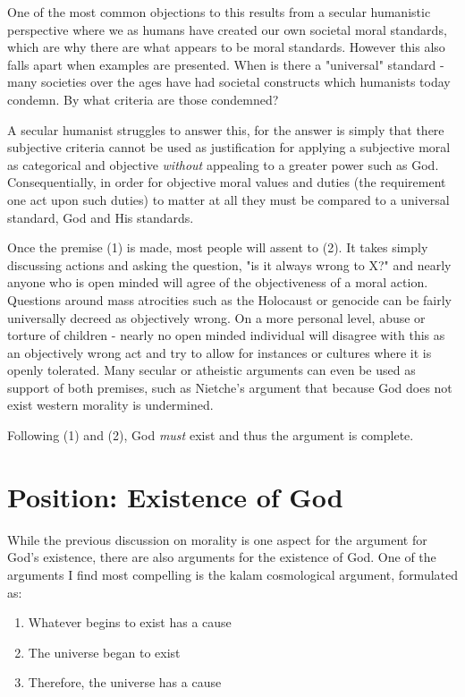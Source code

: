 \documentclass[12pt]{turabian-researchpaper}
\begin{document}
One of the most common objections to this results from a secular humanistic perspective where we as humans have created our own societal moral standards, which are why there are what appears to be moral standards. However this also falls apart when examples are presented. When is there a "universal" standard - many societies over the ages have had societal constructs which humanists today condemn. By what criteria are those condemned? 

A secular humanist struggles to answer this, for the answer is simply that there subjective criteria cannot be used as justification for applying a subjective moral as categorical and objective \textit{without} appealing to a greater power such as God. Consequentially, in order for objective moral values and duties (the requirement one act upon such duties) to matter at all they must be compared to a universal standard, God and His standards.

Once the premise (1) is made, most people will assent to (2). It takes simply discussing actions and asking the question, "is it always wrong to X?" and nearly anyone who is open minded will agree of the objectiveness of a moral action. Questions around mass atrocities such as the Holocaust or genocide can be fairly universally decreed as objectively wrong. On a more personal level, abuse or torture of children - nearly no open minded individual will disagree with this as an objectively wrong act and try to allow for instances or cultures where it is openly tolerated. Many secular or atheistic arguments can even be used as support of both premises, such as Nietche's argument that because God does not exist western morality is undermined. \autocite{evans2014}

Following (1) and (2), God \textit{must} exist and thus the argument is complete.

\section{Position: Existence of God}

While the previous discussion on morality is one aspect for the argument for God's existence, there are also arguments for the existence of God. One of the arguments I find most compelling is the kalam cosmological argument, formulated as:\autocite[pg.111]{craig2008reasonable}

\begin{enumerate}
\item Whatever begins to exist has a cause
\item The universe began to exist
\item Therefore, the universe has a cause
\end{enumerate}
\end{document}
